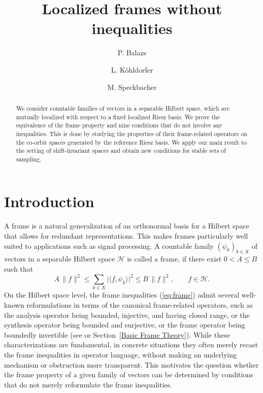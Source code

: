 \documentclass{amsart}
\title{Localized frames without inequalities}
\author{P. Balazs}
\author{L. K\"ohldorfer}
\author{M. Speckbacher}
\date{}
\def\Hil{\mathcal{H}}
\begin{document}
\begin{abstract}
We consider countable families of vectors in a separable Hilbert space, which are mutually localized with respect to a fixed localized Riesz basis. We prove the equivalence of the frame property and nine conditions that do not involve any inequalities. This is done by studying the properties of their frame-related operators on the co-orbit spaces generated by the reference Riesz basis. We apply our main result to the setting of shift-invariant spaces and obtain new conditions for stable sets of sampling. 
\end{abstract}

\maketitle

\section{Introduction}

A frame is a natural generalization of an orthonormal basis for a Hilbert space that allows for redundant representations. This makes frames particularly well suited to applications such as signal processing.
A countable family $(\psi_k)_{k\in X}$ of vectors in a separable Hilbert space $\Hil$ is called a frame, if there exist $0< A \leq B$ such that \begin{equation}\label{eq:frame}
A \, \| f \|^2 \leq
  \sum_{k\in X} \vert \langle f  ,  \psi_k \rangle \vert^2 \leq
  B \, \| f \|^2, \qquad  f\in\Hil.
\end{equation} 
 On the Hilbert space level, the frame inequalities (\ref{eq:frame}) admit several well-known reformulations in terms of the canonical frame-related operators, such as the analysis operator being bounded, injective, and having closed range, or the synthesis operator being bounded and surjective, or the frame operator being boundedly invertible (see \cite{xxlstoeant11} or Section~\ref{Basic Frame Theory}). While these characterizations are fundamental, in concrete situations they often merely recast the frame inequalities in operator language, without making an underlying mechanism or obstruction more transparent. This motivates the question whether the frame property of a given family of vectors can be determined by conditions that do not merely reformulate the frame inequalities.
\end{document}
